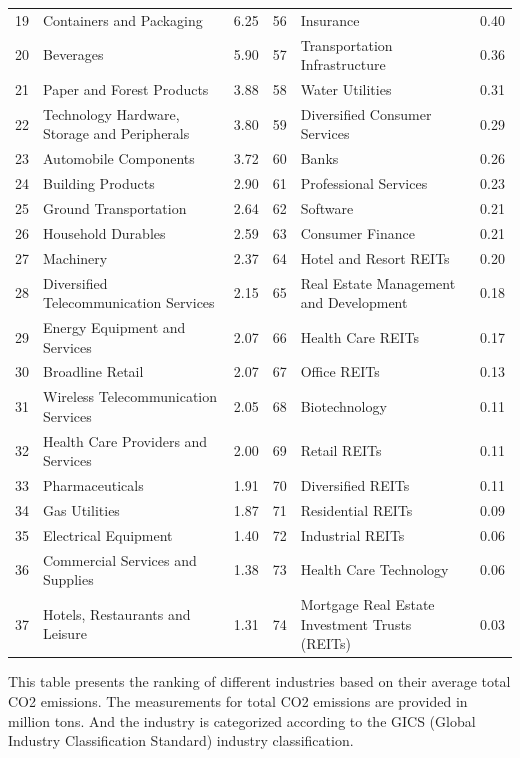 \documentclass[12pt]{article}
\begin{document}
\begin{landscape}
\begin{table}[!ht]
\begin{tabular}{clcclc}
19 & Containers and Packaging & 6.25 & 56 & Insurance & 0.40 \\
20 & Beverages & 5.90 & 57 & Transportation Infrastructure & 0.36 \\
21 & Paper and Forest Products & 3.88 & 58 & Water Utilities & 0.31 \\
22 & Technology Hardware, Storage and Peripherals & 3.80 & 59 & Diversified Consumer Services & 0.29 \\
23 & Automobile Components & 3.72 & 60 & Banks & 0.26 \\
24 & Building Products & 2.90 & 61 & Professional Services & 0.23 \\
25 & Ground Transportation & 2.64 & 62 & Software & 0.21 \\
26 & Household Durables & 2.59 & 63 & Consumer Finance & 0.21 \\
27 & Machinery & 2.37 & 64 & Hotel and Resort REITs & 0.20 \\
28 & Diversified Telecommunication Services & 2.15 & 65 & Real Estate Management and Development & 0.18 \\
29 & Energy Equipment and Services & 2.07 & 66 & Health Care REITs & 0.17 \\
30 & Broadline Retail & 2.07 & 67 & Office REITs & 0.13 \\
31 & Wireless Telecommunication Services & 2.05 & 68 & Biotechnology & 0.11 \\
32 & Health Care Providers and Services & 2.00 & 69 & Retail REITs & 0.11 \\
33 & Pharmaceuticals & 1.91 & 70 & Diversified REITs & 0.11 \\
34 & Gas Utilities & 1.87 & 71 & Residential REITs & 0.09 \\
35 & Electrical Equipment & 1.40 & 72 & Industrial REITs & 0.06 \\
36 & Commercial Services and Supplies & 1.38 & 73 & Health Care Technology & 0.06 \\
37 & Hotels, Restaurants and Leisure & 1.31 & 74 & Mortgage Real Estate Investment Trusts (REITs) & 0.03 \\
\bottomrule
\end{tabular}
\begin{tablenotes}
\footnotesize
\item This table presents the ranking of different industries based on their average total CO2 emissions. The measurements for total CO2 emissions are provided in million tons. And the industry is categorized according to the GICS (Global Industry Classification Standard) industry classification.
\end{tablenotes}
\end{table}
\end{landscape}
\end{document}
